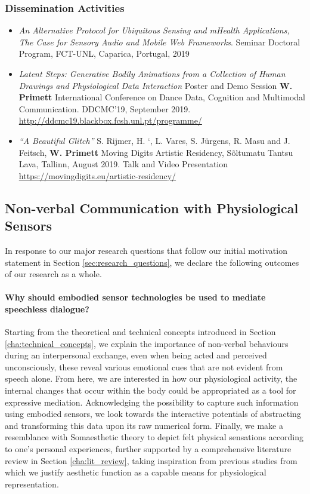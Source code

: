 \subsubsection{Dissemination Activities}
    \begin{itemize}

    \item[] \textit{An Alternative Protocol for Ubiquitous Sensing and mHealth Applications, The Case for Sensory Audio and Mobile Web Frameworks}. Seminar Doctoral Program, FCT-UNL, Caparica, Portugal, 2019

    \item[] \textit{Latent Steps: Generative Bodily Animations from a Collection of Human Drawings and Physiological Data Interaction} Poster and Demo Session
    \textbf{W. Primett}
    International Conference on Dance Data, Cognition and Multimodal Communication. DDCMC’19, September 2019.
    \url{http://ddcmc19.blackbox.fcsh.unl.pt/programme/}

    \item[] \textit{``A Beautiful Glitch''}
        S. Rijmer, H. `, L. Vares, S. Jürgens, R. Masu and J. Feitsch, \textbf{W. Primett}
    Moving Digits Artistic Residency, Sõltumatu Tantsu Lava, Tallinn, August 2019. Talk and Video Presentation
    \url{https://movingdigits.eu/artistic-residency/}
    \end{itemize}

\subsection{Non-verbal Communication with Physiological Sensors}

In response to our major research questions that follow our initial motivation statement in Section \ref{sec:research_questions}, we declare the following outcomes of our research as a whole.

\paragraph{Why should embodied sensor technologies be used to mediate speechless dialogue?}

Starting from the theoretical and technical concepts introduced in Section \ref{cha:technical_concepts}, we explain the importance of non-verbal behaviours during an interpersonal exchange, even when being acted and perceived unconsciously, these reveal various emotional cues that are not evident from speech alone. From here, we are interested in how our physiological activity, the internal changes that occur within the body could be appropriated as a tool for expressive mediation. Acknowledging the possibility to capture such information using embodied sensors, we look towards the interactive potentials of abstracting and transforming this data upon its raw numerical form. Finally, we make a resemblance with Somaesthetic theory to depict felt physical sensations according to one's personal experiences, further supported by a comprehensive literature review in Section \ref{cha:lit_review}, taking inspiration from previous studies from which we justify aesthetic function as a capable means for physiological representation.

